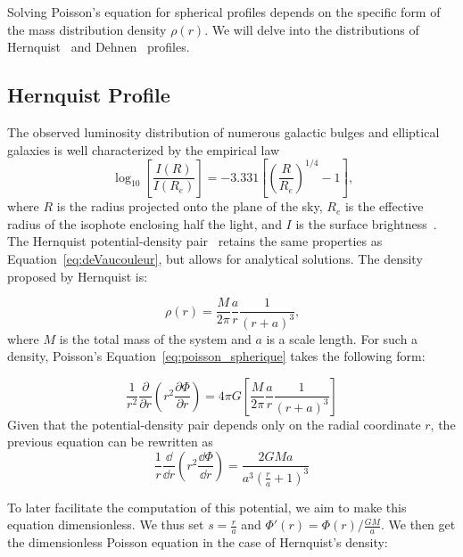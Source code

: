 Solving Poisson's equation for spherical profiles depends on the specific form of the mass distribution density $\rho(r)$. We will delve into the distributions of Hernquist~\cite{hernquist_analytical_1990} and Dehnen~\cite{dehnen_family_1993} profiles.

\subsection{Hernquist Profile}
The observed luminosity distribution of numerous galactic bulges and elliptical galaxies is well characterized by the empirical law
\begin{equation}
\label{eq:deVaucouleur}
\log_{10} \left[ \frac{I(R)}{I(R_e)}\right] = -3.331 \left[ \left(\frac{R}{R_e}\right)^{1/4} - 1\right]\text{,}
\end{equation}
where $R$ is the radius projected onto the plane of the sky, $R_e$ is the effective radius of the isophote enclosing half the light, and $I$ is the surface brightness~\cite{deVaucouleurs1948}. The Hernquist potential-density pair~\cite{hernquist_analytical_1990} retains the same properties as Equation~\eqref{eq:deVaucouleur}, but allows for analytical solutions. The density proposed by Hernquist is:

\begin{equation}
\label{eq:hernquist_density}
\rho(r) = \dfrac{M}{2\pi}\dfrac{a}{r}\dfrac{1}{(r+a)^3}\text{,}
\end{equation}
where $M$ is the total mass of the system and $a$ is a scale length. For such a density, Poisson's Equation~\eqref{eq:poisson_spherique} takes the following form:

\begin{equation*}
\dfrac{1}{r^2} \dfrac{\partial}{\partial r}\left(r^2 \dfrac{\partial \Phi}{\partial r}\right) = 4\pi G \left[\dfrac{M}{2\pi}\dfrac{a}{r}\dfrac{1}{(r+a)^3}\right]
\end{equation*}
Given that the potential-density pair depends only on the radial coordinate $r$, the previous equation can be rewritten as
\begin{equation*}
\dfrac{1}{r} \dfrac{\dd}{\dd r}\left(r^2 \dfrac{\dd \Phi}{\dd r}\right) = \dfrac{2GMa}{a^3(\frac{r}{a}+1)^3}
\end{equation*}

To later facilitate the computation of this potential, we aim to make this equation dimensionless. We thus set $s = \frac{r}{a}$ and $\Phi'(r) = \Phi(r)/\frac{GM}{a}$. We then get the dimensionless Poisson equation in the case of Hernquist's density:


